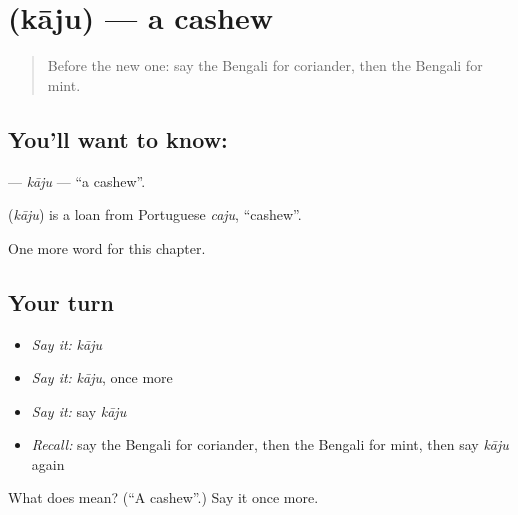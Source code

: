 \section[\texorpdfstring{\bn{কাজু} (kāju)}{কাজু (kāju)}]{ (kāju) — a cashew}

\label{lesson:BN-C249-kaju}



\begin{quote}
Before the new one: say the Bengali for coriander, then the Bengali for mint.
\end{quote}

\subsection*{You'll want to know: }
\textbf{} — \emph{kāju} — \textquotedblleft{}a cashew\textquotedblright{}.

\begin{cousinweb}
\textbf{} (\emph{kāju}) is a loan from Portuguese \emph{caju}, \textquotedblleft{}cashew\textquotedblright{}.
\end{cousinweb}

\begin{grammarlens}[title={What you've built}]
One more word for this chapter.
\end{grammarlens}

\subsection*{Your turn}
\begin{itemize}
\raggedright
  \item \emph{Say it:} \emph{kāju}
  \item \emph{Say it:} \emph{kāju}, once more
  \item \emph{Say it:} say \emph{kāju}
  \item \emph{Recall:} say the Bengali for coriander, then the Bengali for mint, then say \emph{kāju} again
\end{itemize}

\begin{tcolorbox}[breakable,colback=teal!4,colframe=teal!35!black,title={Before you move on}]
What does  mean? (\textquotedblleft{}A cashew\textquotedblright{}.) Say it once more.
\end{tcolorbox}
